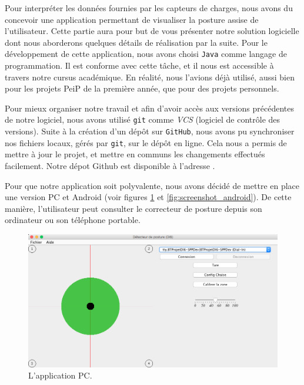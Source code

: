 \documentclass{polytech/polytech}
\begin{document}
Pour interpréter les données fournies par les capteurs de charges, nous avons du concevoir une application permettant de visualiser la posture assise de l'utilisateur.
 Cette partie aura pour but de vous présenter notre solution logicielle dont nous aborderons quelques détails de réalisation par la suite.
Pour le développement de cette application, nous avons choisi \texttt{Java} comme langage de programmation. Il est conforme avec cette tâche, et il nous est accessible à travers notre cursus académique. En réalité, nous l'avions déjà utilisé, aussi bien pour les projets PeiP de la première année, que pour des projets personnels.

Pour mieux organiser notre travail et afin d'avoir accès aux versions précédentes de notre logiciel, nous avons utilisé \texttt{git} comme \textit{VCS} (logiciel de contrôle des versions). Suite à la création d'un dépôt sur \texttt{GitHub}, nous avons pu synchroniser nos fichiers locaux, gérés par \texttt{git}, sur le dépôt en ligne. Cela nous a permis de mettre à jour le projet, et mettre en communs les changements effectués facilement. Notre dépot Github est disponible à l'adresse \cite{repo_github}.

Pour que notre application soit polyvalente, nous avons décidé de mettre en place une version PC et Android (voir figures \ref{fig:screenshot_pc} et \ref{fig:screenshot_android}). De cette manière, l'utilisateur peut consulter le correcteur de posture depuis son ordinateur ou son téléphone portable.

\begin{figure}[htbp]
\begin{center}
\includegraphics[width=12cm]{image/screenshot_pc1}
\end{center}
\caption{L'application PC.}
\label{fig:screenshot_pc}
\end{figure}
\end{document}
